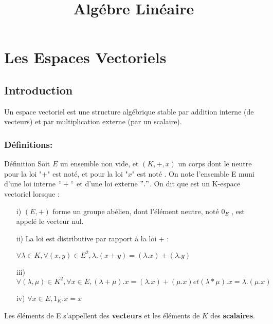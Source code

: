 \documentclass{book}
\title{Algébre Linéaire}
\begin{document}
\tableofcontents
\chapter{Les Espaces Vectoriels}
\section{Introduction}
Un espace vectoriel est une structure algébrique stable par addition interne (de vecteurs) et par multiplication externe (par un scalaire).
\subsection{Définitions:}
\begin{Définition}[]{Définition}{}
Soit \(E\) un ensemble non vide, et \((K,+,x)\) un corps dont le neutre pour la loi "\(+\)" est noté, et pour la loi "\(x\)" est noté .
\newline
On note l’ensemble E muni d’une loi interne  \("+"\)   et d’une loi externe  \("."\).
\newline
On dit que  est un K-espace vectoriel lorsque :
\begin{itemize}
    \item[i)] \((E,+)\) forme un groupe abélien, dont l'élément neutre, noté \(0_E\) , est appelé le vecteur nul.
    \item[ii)] La loi est distributive par rapport à la loi + : 

\( \forall \lambda \in K, \forall (x, y) \in E^2 , \lambda.(x+y) =(\lambda.x) + (\lambda.y)\)
    \item[iii)] \(\forall (\lambda , \mu) \in K^2, \forall x \in E, (\lambda+\mu).x=(\lambda.x)+(\mu.x) et (\lambda*\mu).x=\lambda.(\mu.x)\)
    \item[iv)] \(\forall x \in E, 1_K.x=x\)
\end{itemize}

Les éléments de E s'appellent des \textbf{vecteurs} et les éléments de \(K\) des \textbf{scalaires}.
\end{Définition}
\end{document}
